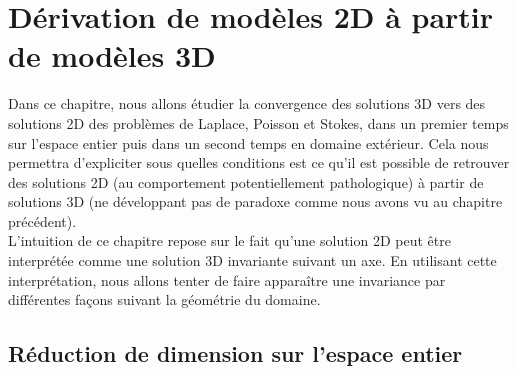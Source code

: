 \chapter{Dérivation de modèles 2D à partir de modèles 3D}

Dans ce chapitre, nous allons étudier la convergence des solutions 3D vers des solutions 2D des problèmes de Laplace, Poisson et Stokes, dans un premier temps sur l'espace entier puis dans un second temps en domaine extérieur. Cela nous permettra d'expliciter sous quelles conditions est ce qu'il est possible de retrouver des solutions 2D (au comportement potentiellement pathologique) à partir de solutions 3D (ne développant pas de paradoxe comme nous avons vu au chapitre précédent).\\
L'intuition de ce chapitre repose sur le fait qu'une solution 2D peut être interprétée comme une solution 3D invariante suivant un axe. En utilisant cette interprétation, nous allons tenter de faire apparaître une invariance par différentes façons suivant la géométrie du domaine.


\section{Réduction de dimension sur l'espace entier}

